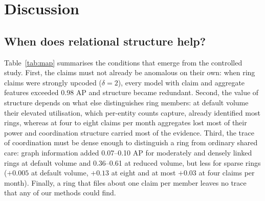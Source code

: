 \documentclass[pdflatex,sn-vancouver-num]{sn-jnl}
\begin{document}
\section{Discussion}\label{sec:discussion}

\subsection{When does relational structure help?}
Table~\ref{tab:map} summarises the conditions that emerge from the controlled
study. First, the claims must not already be anomalous on their own: when
ring claims were strongly upcoded ($\delta=2$), every model with claim and
aggregate features exceeded 0.98 AP and structure became redundant. Second,
the value of structure depends on what else distinguishes ring members: at
default volume their elevated utilisation, which per-entity counts capture,
already identified most rings, whereas at four to eight claims per month
aggregates lost most of their power and coordination structure carried most
of the evidence. Third, the trace of coordination must be dense enough to
distinguish a ring from ordinary shared care: graph information added
0.07--0.10 AP for moderately and densely linked rings at default volume and
0.36--0.61 at reduced volume, but less for sparse rings ($+0.005$ at default
volume, $+0.13$ at eight and at most $+0.03$ at four claims per month).
Finally, a ring
that files about one claim per member leaves no trace that any of our methods
could find.
\end{document}
